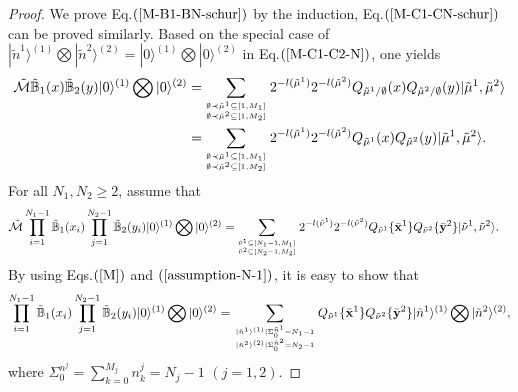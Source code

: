 \documentclass[11pt,reqno]{amsart}
\numberwithin{equation}{section}
\begin{document}
	\begin{proof}
		
		We prove Eq.$(\ref{M-B1-BN-schur})$ by the   induction, Eq.$(\ref{M-C1-CN-schur})$  can be proved similarly.	
		Based on the special case of $|\tilde{n}^{1}\rangle^{(1)}\bigotimes|\tilde{n}^{2}\rangle^{(2)}=|0\rangle^{(1)}\bigotimes|0\rangle^{(2)}$ in Eq.$(\ref{M-C1-C2-N})$, one yields
		\begin{align}
			\tilde{\mathcal{M}} \tilde{\mathbb{B}}_{1}(x)\tilde{\mathbb{B}}_{2}(y) |0\rangle^{(1)}\bigotimes|0\rangle^{(2)}
			=& \sum_{{ \emptyset \prec \tilde{\mu}^{1} \subseteq [1,M_{1}]}\atop{\emptyset \prec \tilde{\mu}^{2} \subseteq [1,M_{2}]}}
			2^{- l(\tilde{\mu}^{1})}	2^{- l(\tilde{\mu}^{2})}	
			Q_{{\tilde{\mu}^{1}}/\emptyset}(x) 	Q_{{\tilde{\mu}^{2}}/\emptyset}(y)
			|\tilde{\mu}^{1},\tilde{\mu}^{2}\rangle \notag\\
			=&\sum_{{ \emptyset \prec \tilde{\mu}^{1} \subseteq [1,M_{1}]}\atop{\emptyset \prec \tilde{\mu}^{2} \subseteq [1,M_{2}]}}
			2^{- l(\tilde{\mu}^{1})}		2^{-l(\tilde{\mu}^{2})}	
			Q_{\tilde{\mu}^{1}}(x)  	Q_{\tilde{\mu}^{2}}(y)  |\tilde{\mu}^{1},\tilde{\mu}^{2}\rangle .
		\end{align}
		For all $N_{1}, N_{2}\geq 2$, assume that
		\begin{align}\label{assumption-N-1}
			\tilde{\mathcal{M}}
			\prod_{i=1}^{N_{1}-1} \tilde{\mathbb{B}}_{1}(x_i)
			\prod_{j=1}^{N_{2}-1} \tilde{\mathbb{B}}_{2}(y_i)
			|0\rangle^{(1)}\bigotimes|0\rangle^{(2)}
			= &\sum_{{ \tilde{\nu}^{1} \subseteq [N_{1}-1,M_1]}\atop{\tilde{\nu}^{2} \subseteq [N_{2}-1,M_2]}}
			2^{- l(\tilde{\nu}^{1})}	2^{- l(\tilde{\nu}^{2})}			
			Q_{\tilde{\nu}^{1}}\{\bar{\mathbf{x}}^1\}  Q_{\tilde{\nu}^{2}}\{ \bar{\mathbf{y}}^2 \}
			| \tilde{\nu}^{1},\tilde{\nu}^{2} \rangle.
		\end{align}	
		By using Eqs.$(\ref{M})$ and $(\ref{assumption-N-1})$, it is easy to show that
		\begin{align}
			\prod_{i=1}^{N_{1}-1} \tilde{\mathbb{B}}_{1}(x_i)
			\prod_{j=1}^{N_{2}-1} \tilde{\mathbb{B}}_{2}(y_i)
			|0\rangle^{(1)}\bigotimes|0\rangle^{(2)}
			= \sum_{{ 	| \tilde{n}^{1}\rangle^{(1)}|\Sigma_0^{\tilde{n}^{1}} =N_{1}-1}\atop{| \tilde{n}^{2}\rangle^{(2)}|\Sigma_0^{\tilde{n}^{2}}=N_{2}-1} }
			Q_{\tilde{\nu}^{1}}\{\bar{\mathbf{x}}^1\}  Q_{\tilde{\nu}^{2}}\{ \bar{\mathbf{y}}^2 \}
			| \tilde{n}^{1}\rangle^{(1)}\bigotimes|\tilde{n}^{2}\rangle^{(2)},
		\end{align}	
		where  $\Sigma_0^{n^j} = \sum\limits_{k=0}^{M_j} n_k^j=N_{j}-1$ $(j=1,2)$.

\end{proof}
\end{document}
